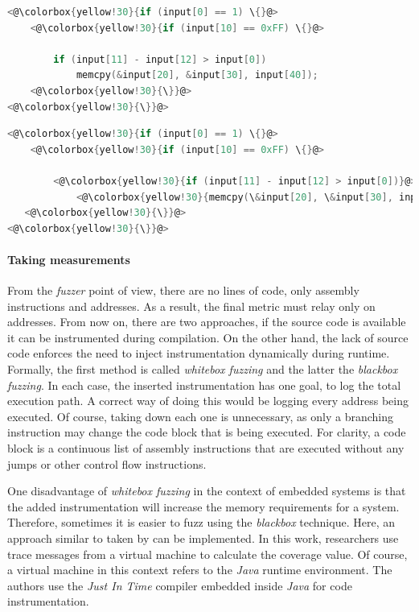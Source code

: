 \begin{minipage}\linewidth
    \begin{lstlisting}[language=C,caption={Code coverage of the first testcase.},label={lst:tc1},captionpos=b]
<@\colorbox{yellow!30}{if (input[0] == 1) \{}@>
    <@\colorbox{yellow!30}{if (input[10] == 0xFF) \{}@>

        if (input[11] - input[12] > input[0])
            memcpy(&input[20], &input[30], input[40]);
    <@\colorbox{yellow!30}{\}}@>
<@\colorbox{yellow!30}{\}}@>
    \end{lstlisting}
\end{minipage}

\begin{minipage}\linewidth
    \begin{lstlisting}[language=C,caption={Code coverage of second testcase.},label={lst:tc2},captionpos=b]
<@\colorbox{yellow!30}{if (input[0] == 1) \{}@>
    <@\colorbox{yellow!30}{if (input[10] == 0xFF) \{}@>

        <@\colorbox{yellow!30}{if (input[11] - input[12] > input[0])}@>
            <@\colorbox{yellow!30}{memcpy(\&input[20], \&input[30], input[40]);}@>
   <@\colorbox{yellow!30}{\}}@>
<@\colorbox{yellow!30}{\}}@>
    \end{lstlisting}
\end{minipage}

\paragraph{Taking measurements}
From the \textit{fuzzer} point of view, there are no lines of code, only assembly instructions and addresses. As a result, the final metric must relay only on addresses. From now on, there are two approaches, if the source code is available it can be instrumented during compilation. On the other hand, the lack of source code enforces the need to inject instrumentation dynamically during runtime. Formally, the first method is called \textit{whitebox fuzzing} and the latter the \textit{blackbox fuzzing}. In each case, the inserted instrumentation has one goal, to log the total execution path. A correct way of doing this would be logging every address being executed. Of course, taking down each one is unnecessary, as only a branching instruction may change the code block that is being executed. For clarity, a code block is a continuous list of assembly instructions that are executed without any jumps or other control flow instructions. 

One disadvantage of \textit{whitebox fuzzing} in the context of embedded systems is that the added instrumentation will increase the memory requirements for a system. Therefore, sometimes it is easier to fuzz using the \textit{blackbox} technique. Here, an approach similar to taken by \cite{tracecoverage} can be implemented. In this work, researchers use trace messages from a virtual machine to calculate the coverage value. Of course, a virtual machine in this context refers to the \textit{Java} runtime environment. The authors use the \textit{Just In Time} compiler embedded inside \textit{Java} for code instrumentation.

